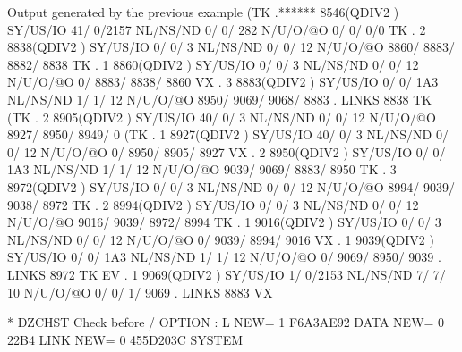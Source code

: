 \begin{Listing}{Output generated by the previous example}
(TK  .******     8546(QDIV2   ) SY/US/IO   41/    0/2157 NL/NS/ND    0/    0/     282 N/U/O/@O       0/       0/       0/0       
 TK  .     2     8838(QDIV2   ) SY/US/IO    0/    0/   3 NL/NS/ND    0/    0/      12 N/U/O/@O    8860/    8883/    8882/    8838
 TK  .     1     8860(QDIV2   ) SY/US/IO    0/    0/   3 NL/NS/ND    0/    0/      12 N/U/O/@O       0/    8883/    8838/    8860
 VX  .     3     8883(QDIV2   ) SY/US/IO    0/    0/ 1A3 NL/NS/ND    1/    1/      12 N/U/O/@O    8950/    9069/    9068/    8883
     . LINKS      8838 TK                                                                                                        
(TK  .     2     8905(QDIV2   ) SY/US/IO   40/    0/   3 NL/NS/ND    0/    0/      12 N/U/O/@O    8927/    8950/    8949/       0
(TK  .     1     8927(QDIV2   ) SY/US/IO   40/    0/   3 NL/NS/ND    0/    0/      12 N/U/O/@O       0/    8950/    8905/    8927
 VX  .     2     8950(QDIV2   ) SY/US/IO    0/    0/ 1A3 NL/NS/ND    1/    1/      12 N/U/O/@O    9039/    9069/    8883/    8950
 TK  .     3     8972(QDIV2   ) SY/US/IO    0/    0/   3 NL/NS/ND    0/    0/      12 N/U/O/@O    8994/    9039/    9038/    8972
 TK  .     2     8994(QDIV2   ) SY/US/IO    0/    0/   3 NL/NS/ND    0/    0/      12 N/U/O/@O    9016/    9039/    8972/    8994
 TK  .     1     9016(QDIV2   ) SY/US/IO    0/    0/   3 NL/NS/ND    0/    0/      12 N/U/O/@O       0/    9039/    8994/    9016
 VX  .     1     9039(QDIV2   ) SY/US/IO    0/    0/ 1A3 NL/NS/ND    1/    1/      12 N/U/O/@O       0/    9069/    8950/    9039
     . LINKS      8972 TK                                                                                                        
 EV  .     1     9069(QDIV2   ) SY/US/IO    1/    0/2153 NL/NS/ND    7/    7/      10 N/U/O/@O       0/       0/       1/    9069
     . LINKS      8883 VX                                                                                                        
                                                                                                                                 
* DZCHST Check before        / OPTION : L     NEW=   1         F6A3AE92                                     DATA                 
                                              NEW=   0             22B4                                     LINK                 
                                              NEW=   0         455D203C                                     SYSTEM               
                                                                                                                                 

\end{Listing}

